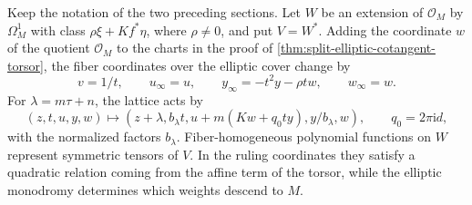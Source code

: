 Keep the notation of the two preceding sections. Let $W$ be an extension of $\mathcal O_M$ by $\Omega_M^1$ with class $\rho\xi+Kf^*\eta$, where $\rho\ne0$, and put $V=W^*$. Adding the coordinate $w$ of the quotient $\mathcal O_M$ to the charts in the proof of \cref{thm:split-elliptic-cotangent-torsor}, the fiber coordinates over the elliptic cover change by
\[
 v=1/t,\qquad u_\infty=u,\qquad
 y_\infty=-t^2y-\rho t w,\qquad w_\infty=w.
\]
For $\lambda=m\tau+n$, the lattice acts by
\[
 (z,t,u,y,w)\longmapsto
 (z+\lambda,b_\lambda t,u+m(Kw+q_0ty),y/b_\lambda,w),
 \qquad q_0=2\pi\mathrm{i}d,
\]
with the normalized factors $b_\lambda$. Fiber-homogeneous polynomial functions on $W$ represent symmetric tensors of $V$. In the ruling coordinates they satisfy a quadratic relation coming from the affine term of the torsor, while the elliptic monodromy determines which weights descend to $M$.

